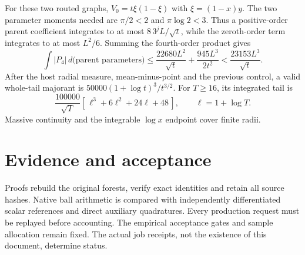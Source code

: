 \documentclass[11pt]{article}
\begin{document}
For these two routed graphs, $V_0=t\xi(1-\xi)$ with $\xi=(1-x)y$.
The two parameter moments needed are $\pi/2<2$ and $\pi\log2<3$.
Thus a positive-order parent coefficient integrates to at most
$8\,3^jL/\sqrt t$, while the zeroth-order term integrates to at most $L^2/6$.
Summing the fourth-order product gives
\[
 \int |P_4|\,d\text{(parent parameters)}
 \le \frac{22680L^2}{\sqrt t}+\frac{945L^3}{2t^2}
 <\frac{23153L^3}{\sqrt t}.
\]
After the host radial measure, mean-minus-point and the previous control,
a valid whole-tail majorant is $50000(1+\log t)^3/t^{3/2}$.
For $T\ge16$, its integrated tail is
\[
 \frac{100000}{\sqrt T}
 [\,\ell^3+6\ell^2+24\ell+48\,],\qquad \ell=1+\log T.
\]
Massive continuity and the integrable $\log x$ endpoint cover finite radii.

\section{Evidence and acceptance}
Proofs rebuild the original forests, verify exact identities and retain
all source hashes. Native ball arithmetic is compared with independently
differentiated scalar references and direct auxiliary quadratures.
Every production request must be replayed before accounting.
The empirical acceptance gates and sample allocation remain fixed.
The actual job receipts, not the existence of this document, determine status.
\end{document}
